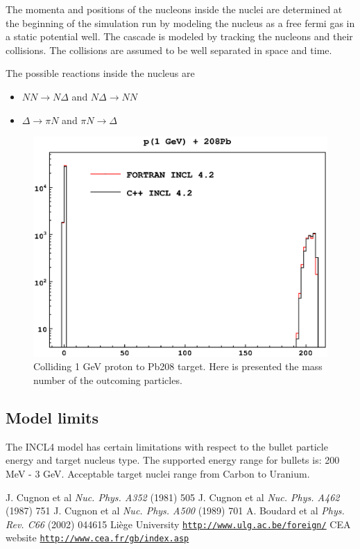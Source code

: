 \documentclass[12pt,a4paper]{article}
\begin{document}
The momenta and positions of the nucleons inside the nuclei are
determined at the beginning of the simulation run by modeling the
nucleus as a free fermi gas in a static potential well. The cascade is
modeled by tracking the nucleons and their collisions. The collisions
are assumed to be well separated in space and time.

The possible reactions inside the nucleus are 
\begin{itemize}
\item $NN \rightarrow N \Delta$ and $N \Delta \rightarrow NN$ 
\item $\Delta \rightarrow \pi N$ and $\pi N \rightarrow \Delta$
\end{itemize}

\begin{figure}[ht]
\begin{center}
\includegraphics[scale=0.6]{Pb208Proton1GeV.eps}
\end{center}
\caption{Colliding 1 GeV proton to Pb208 target. Here is presented the
mass number of the outcoming particles.}
\end{figure}

\subsection{Model limits}

The INCL4 model has certain limitations with respect to the bullet
particle energy and target nucleus type. The supported energy range
for bullets is: 200 MeV - 3 GeV. Acceptable target nuclei range from
Carbon to Uranium.


\begin{thebibliography}{99}
 J. Cugnon et al \emph{Nuc. Phys. A352} (1981) 505
 J. Cugnon et al \emph{Nuc. Phys. A462} (1987) 751
 J. Cugnon et al \emph{Nuc. Phys. A500} (1989) 701
 A. Boudard et al \emph{Phys. Rev. C66} (2002) 044615
 Li\`ege University
\href{http://www.ulg.ac.be/foreign/}{{\tt http://www.ulg.ac.be/foreign/}}
 CEA website
  \href{http://www.cea.fr/gb/index.asp}{{\tt http://www.cea.fr/gb/index.asp}}
\end{thebibliography}
\end{document}
